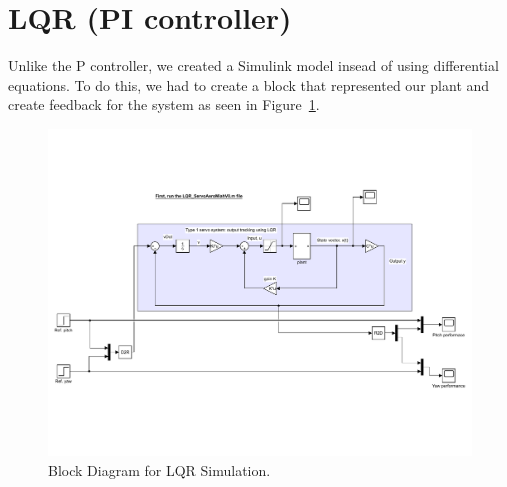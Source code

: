 \section{LQR (PI controller)}
Unlike the P controller, we created a Simulink model insead of using differential equations.  To do this, we had to create a block that represented our plant and create feedback for the system as seen in Figure~\ref{fig:LQR_Sim_Block_Diagram}.  
\begin{figure}[!htbp]
    \centering
    \includegraphics[width=.8\textwidth,keepaspectratio=true]{figs/img/LQR_Simulink_Sim}
    \caption{Block Diagram for LQR Simulation.}
    \label{fig:LQR_Sim_Block_Diagram}
\end{figure}
